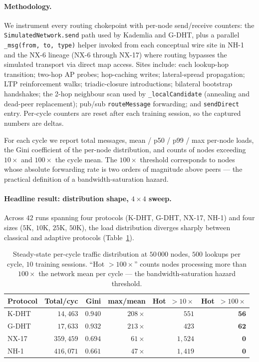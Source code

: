 \documentclass[conference]{IEEEtran}
\newcommand{\nhone}{NH-1\xspace}
\newcommand{\GDHT}{G-DHT\xspace}
\newcommand{\NXseventeen}{NX-17\xspace}
\begin{document}
\paragraph{Methodology.} We instrument every routing chokepoint with
per-node send/receive counters: the \texttt{SimulatedNetwork.send}
path used by Kademlia and \GDHT, plus a parallel \texttt{\_msg(from,
to, type)} helper invoked from each conceptual wire site in \nhone
and the NX-6 lineage (NX-6 through \NXseventeen) where routing
bypasses the simulated transport via direct map access. Sites
include: each lookup-hop transition; two-hop AP probes; hop-caching
writes; lateral-spread propagation; LTP reinforcement walks;
triadic-closure introductions; bilateral bootstrap handshakes; the
2-hop neighbour scan used by \texttt{\_localCandidate} (annealing and
dead-peer replacement); pub/sub \texttt{routeMessage} forwarding; and
\texttt{sendDirect} entry. Per-cycle counters are reset after each
training session, so the captured numbers are deltas.

For each cycle we report total messages, mean / p50 / p99 / max
per-node loads, the Gini coefficient of the per-node distribution,
and counts of nodes exceeding $10\times$ and $100\times$ the cycle
mean. The $100\times$ threshold corresponds to nodes whose absolute
forwarding rate is two orders of magnitude above peers --- the
practical definition of a bandwidth-saturation hazard.

\paragraph{Headline result: distribution shape, $4 \times 4$
sweep.} Across $42$ runs spanning four protocols (\textsc{K-DHT},
\GDHT, \NXseventeen, \nhone) and four sizes ($5\mathrm{K}$,
$10\mathrm{K}$, $25\mathrm{K}$, $50\mathrm{K}$), the load
distribution diverges sharply between classical and adaptive
protocols (Table~\ref{tab:bandwidth}).

\begin{table}[t]
\centering
\caption{Steady-state per-cycle traffic distribution at $50\,000$
nodes, $500$ lookups per cycle, $10$ training sessions. ``Hot
$>100\times$'' counts nodes processing more than $100\times$ the
network mean per cycle --- the bandwidth-saturation hazard
threshold.}
\label{tab:bandwidth}
\small
\begin{tabular}{@{}lrrrrr@{}}
\toprule
\textbf{Protocol} & \textbf{Total/cyc} & \textbf{Gini} &
\textbf{max/mean} & \textbf{Hot~$>10\times$} &
\textbf{Hot~$>100\times$} \\
\midrule
\textsc{K-DHT} & $14{,}463$ & $\mathbf{0.940}$ & $208\times$ &
$551$ & $\mathbf{56}$ \\
\GDHT          & $17{,}633$ & $\mathbf{0.932}$ & $213\times$ &
$423$ & $\mathbf{62}$ \\
\NXseventeen   & $359{,}459$ & $0.694$ & $61\times$ & $1{,}524$ &
$\mathbf{0}$ \\
\nhone         & $416{,}071$ & $0.661$ & $47\times$ & $1{,}419$ &
$\mathbf{0}$ \\
\bottomrule
\end{tabular}
\end{table}
\end{document}
